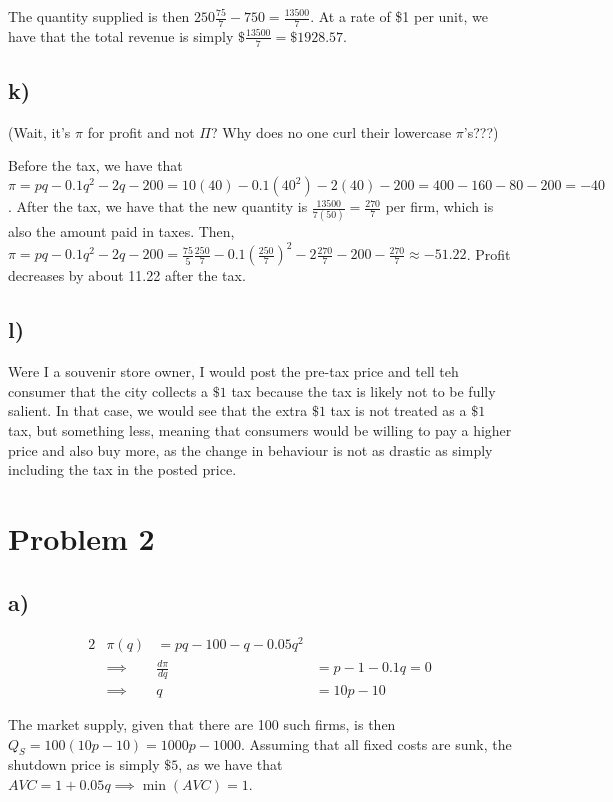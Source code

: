 \documentclass[12pt,letterpaper]{article}
\theoremstyle{definition}
\begin{document}
The quantity supplied is then $250\frac{75}{7} - 750 = \frac{13500}{7}$. At a
rate of \$1 per unit, we have that the total revenue is simply
$\$\frac{13500}{7} = \$1928.57$.

\subsection*{k)}

(Wait, it's $\pi$ for profit and not $\Pi$? Why does no one curl their lowercase $\pi$'s???)

Before the tax, we have that $\pi = pq - 0.1q^2 - 2q - 200 = 10(40) - 0.1(40^2)
- 2(40) - 200 = 400 - 160 - 80 - 200 = -40$. After the tax, we have that the new
quantity is $\frac{13500}{7(50)} = \frac{270}{7}$ per firm, which is also the
amount paid in taxes. Then, $\pi = pq -
0.1q^2 - 2q - 200 = \frac{75}{5}\frac{250}{7} - 0.1(\frac{250}{7})^2 -
2\frac{270}{7} - 200 - \frac{270}{7} \approx -51.22$. Profit decreases by about
11.22 after the tax.

\subsection*{l)}

Were I a souvenir store owner, I would post the pre-tax price and tell teh
consumer that the city collects a $\$1$ tax because the tax is likely not to be
fully salient. In that case, we would see that the extra $\$1$ tax is not
treated as a $\$1$ tax, but something less, meaning that consumers would be
willing to pay a higher price and also buy more, as the change in behaviour is
not as drastic as simply including the tax in the posted price.

\section*{Problem 2}

\subsection*{a)}

\begin{alignat*}{2}
  &\pi(q) &= pq - 100 - q -0.05q^2 \\
  &\implies& \frac{d\pi}{dq} &= p - 1 -0.1q = 0\\
  &\implies& q &= 10p - 10
\end{alignat*}

The market supply, given that there are 100 such firms, is then $Q_S = 100(10p-10) =
1000p - 1000$. Assuming that all fixed costs are sunk, the shutdown price is simply
$\$5$, as we have that $AVC = 1 + 0.05q \implies  \min(AVC) = 1$.
\end{document}
